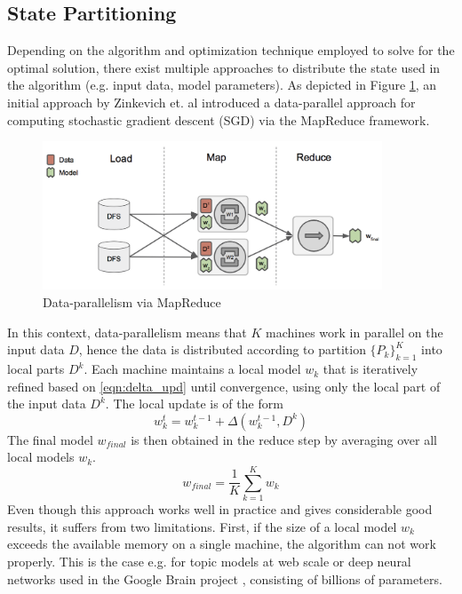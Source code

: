 \subsection{State Partitioning}
\label{ss:state_partitioning}
Depending on the algorithm and optimization technique employed to solve for the optimal solution, there exist multiple approaches to distribute the state used in the algorithm (e.g. input data, model parameters).
As depicted in Figure \ref{fig:data_parallelism}, an initial approach by Zinkevich et. al \cite{zinkevich2010parallelized} introduced a data-parallel approach for computing stochastic gradient descent (SGD) via the MapReduce framework.
\begin{figure}[ht]
\centering
\includegraphics[width=0.9\textwidth]{img/data_parallelism.png}
\caption{Data-parallelism via MapReduce}
\label{fig:data_parallelism}
\end{figure}
In this context, data-parallelism means that $K$ machines work in parallel on the input data $D$, hence the data is distributed according to partition $\{P_k\}_{k=1}^K$ into local parts $D^k$.
Each machine maintains a local model $w_k$ that is iteratively refined based on \ref{eqn:delta_upd} until convergence, using only the local part of the input data $D^k$.
The local update is of the form
\begin{equation}
w_k^{t} = w_k^{t-1} + \Delta(w_k^{t-1},D^k)
\label{eqn:local_delta_upd}
\end{equation}
The final model $w_{final}$ is then obtained in the reduce step by averaging over all local models $w_{k}$.
\begin{equation}
w_{final} = \frac{1}{K}\sum_{k=1}^{K}w_{k}
\label{eqn:avg_sgd}
\end{equation}
Even though this approach works well in practice and gives considerable good results, it suffers from two limitations.
First, if the size of a local model $w_k$ exceeds the available memory on a single machine, the algorithm can not work properly.
This is the case e.g. for topic models at web scale or deep neural networks used in the Google Brain project \cite{dean2012large}, consisting of billions of parameters.
